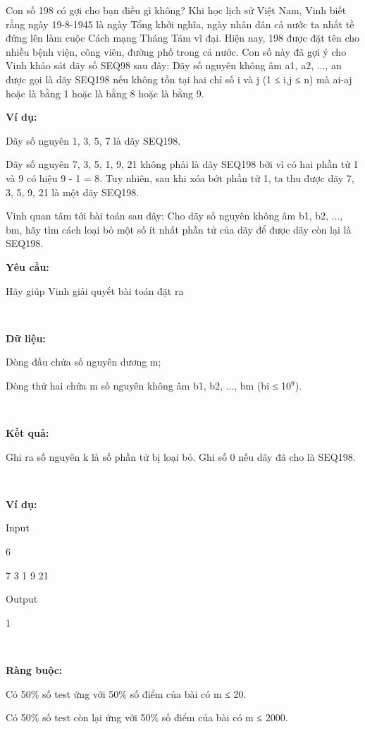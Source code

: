 

Con số 198 có gợi cho bạn điều gì không? Khi học lịch sử Việt Nam, Vinh biết rằng ngày 19-8-1945 là ngày Tổng khởi nghĩa, ngày nhân dân cả nước ta nhất tề đứng lên làm cuộc Cách mạng Tháng Tám vĩ đại. Hiện nay, 198 được đặt tên cho nhiều bệnh viện, công viên, đường phố trong cả nước. Con số này đã gợi ý cho Vinh khảo sát dãy số SEQ98 sau đây: Dãy số nguyên không âm a1, a2, ..., an được gọi là dãy SEQ198 nếu không tồn tại hai chỉ số i và j (1 ≤ i,j ≤ n) mà ai-aj hoặc là bằng 1 hoặc là bằng 8 hoặc là bằng 9.

\textbf{Ví dụ:}

Dãy số nguyên 1, 3, 5, 7 là dãy SEQ198.

Dãy số nguyên 7, 3, 5, 1, 9, 21 không phải là dãy SEQ198 bởi vì có hai phần tử 1 và 9 có hiệu 9 - 1 = 8. Tuy nhiên, sau khi xóa bớt phần tử 1, ta thu được dãy 7, 3, 5, 9, 21 là một dãy SEQ198.

Vinh quan tâm tới bài toán sau đây: Cho dãy số nguyên không âm b1, b2, ..., bm, hãy tìm cách loại bỏ một số ít nhất phần tử của dãy để được dãy còn lại là SEQ198.

\textbf{Yêu cầu:}

Hãy giúp Vinh giải quyết bài toán đặt ra

 

\textbf{Dữ liệu:}

Dòng đầu chứa số nguyên dương m;

Dòng thứ hai chứa m số nguyên không âm b1, b2, ..., bm (bi ≤ 10$^9$).

 

\textbf{Kết quả:}

Ghi ra số nguyên k là số phần tử bị loại bỏ. Ghi số 0 nếu dãy đã cho là SEQ198.

 

\textbf{Ví dụ:}

Input

6

7 3 1 9 21

Output

1

 

\textbf{Ràng buộc:}

Có 50\% số test ứng với 50\% số điểm của bài có m ≤ 20.

Có 50\% số test còn lại ứng với 50\% số điểm của bài có m ≤ 2000.